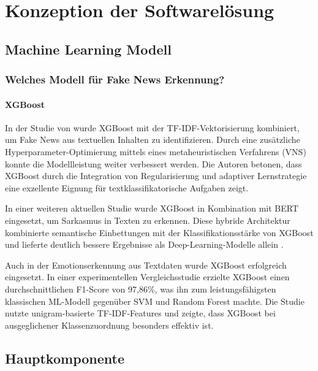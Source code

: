 \chapter{Konzeption der Softwarelösung}
\label{chap:konzeption_der_softwareloesung}

\section{Machine Learning Modell} %

\subsection{Welches Modell für Fake News Erkennung?}

\subsubsection{XGBoost}



In der Studie von \cite{petrovic2024} wurde XGBoost mit der TF-IDF-Vektorisierung kombiniert, 
um Fake News aus textuellen Inhalten zu identifizieren. Durch eine zusätzliche Hyperparameter-Optimierung mittels eines 
metaheuristischen Verfahrens (VNS) konnte die Modellleistung weiter verbessert werden. Die Autoren betonen, 
dass XGBoost durch die Integration von Regularisierung und adaptiver Lernstrategie eine exzellente Eignung für textklassifikatorische 
Aufgaben zeigt.

In einer weiteren aktuellen Studie wurde XGBoost in Kombination mit BERT eingesetzt, um Sarkasmus in Texten zu erkennen. 
Diese hybride Architektur kombinierte semantische Einbettungen mit der Klassifikationsstärke von XGBoost und lieferte deutlich bessere 
Ergebnisse als Deep-Learning-Modelle allein \cite{sharma2025}.

Auch in der Emotionserkennung aus Textdaten wurde XGBoost erfolgreich eingesetzt. 
In einer experimentellen Vergleichsstudie erzielte XGBoost einen durchschnittlichen F1-Score von 97{,}86\%, 
was ihn zum leistungsfähigsten klassischen ML-Modell gegenüber SVM und Random Forest machte\cite{paksoy2024}. 
Die Studie nutzte unigram-basierte TF-IDF-Features und zeigte, dass XGBoost bei ausgeglichener Klassenzuordnung besonders effektiv ist.


\section{Hauptkomponente} \label{sec:06:hauptkomponente}

